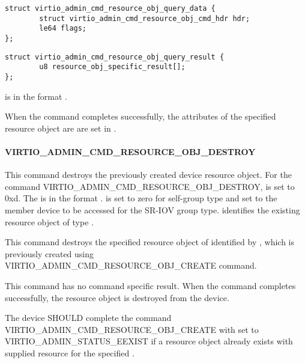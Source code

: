 \begin{lstlisting}
struct virtio_admin_cmd_resource_obj_query_data {
        struct virtio_admin_cmd_resource_obj_cmd_hdr hdr;
        le64 flags;
};
\end{lstlisting}

\begin{lstlisting}
struct virtio_admin_cmd_resource_obj_query_result {
        u8 resource_obj_specific_result[];
};
\end{lstlisting}

 is in the format
.

When the command completes successfully, the attributes of the specified
resource object are are set in .

\paragraph{VIRTIO_ADMIN_CMD_RESOURCE_OBJ_DESTROY}
\label{par:Basic Facilities of a Virtio Device / Device groups / Group administration commands / Device resource objects / VIRTIO_ADMIN_CMD_RESOURCE_OBJ_DESTROY}

This command destroys the previously created device resource object.
For the command VIRTIO_ADMIN_CMD_RESOURCE_OBJ_DESTROY,  is set to 0xd.
The  is in the format
.
 is set to zero for self-group type and set to
the member device to be accessed for the SR-IOV group type.
 identifies the existing resource object of type .

This command destroys the specified resource object of  identified
by , which is previously created using
VIRTIO_ADMIN_CMD_RESOURCE_OBJ_CREATE command.

This command has no command specific result.
When the command completes successfully, the resource object is destroyed from the device.


The device SHOULD complete the command VIRTIO_ADMIN_CMD_RESOURCE_OBJ_CREATE
with  set to VIRTIO_ADMIN_STATUS_EEXIST if a resource object already exists
with supplied resource  for the specified .

